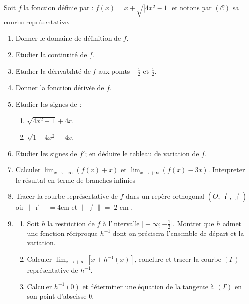 \begin{exo}
\label{exo:fn irrationnelle}
Soit $f$ la fonction d\'efinie par : 
$\displaystyle{
f(x) = x + \sqrt{|4x^2 - 1|}
}$
et notons par $(\mathcal{C})$ sa courbe repr\'esentative.
\begin{enumerate}
\item Donner le domaine de d\'efinition de $f$.
\item Etudier la continuit\'e de $f$.
\item Etudier la d\'erivabilit\'e de $f$ aux points $-\frac{1}{2}$ et $\frac{1}{2}$.
\item Donner la fonction d\'eriv\'ee de $f$.
\item Etudier les signes de : 
     \begin{enumerate}
     \item $\sqrt{4x^2 - 1} + 4x$.
     \item $\sqrt{1 - 4x^2} - 4x$.
     \end{enumerate}
\item Etudier les signes de $f'$; en d\'eduire le tableau de variation de $f$.
\item Calculer $\lim_{x \rightarrow - \infty} \left( f(x) + x \right)$ et $\lim_{x \rightarrow + \infty} \left( f(x) - 3 x \right) $.
      Interpreter le r\'esultat en terme de branches infinies.
\item Tracer la courbe repr\'esentative de $f$ dans un rep\`ere orthogonal $(O, \vec{\imath},\vec{\jmath})$ o\`u $\|\vec{\imath}\| = \text{4cm}$ et $\| \vec{\jmath} \| = \text{ 2 cm } $.
\item 
      \begin{enumerate}
      \item Soit $h$ la restriction de $f$ \`a l'intervalle $]-\infty ; -\frac{1}{2} ]$.
            Montrer que $h$ admet une fonction r\'eciproque $h^{-1}$ dont on pr\'ecisera l'ensemble de d\'epart et la variation.
      \item Calculer $\lim_{x \rightarrow + \infty} \left[ x + h^{-1} (x) \right]$, conclure et tracer la courbe $(\Gamma)$ repr\'esentative de $h^{-1}$.
      \item Calculer $h^{-1} (0)$ et d\'eterminer une \'equation de la tangente \`a $(\Gamma)$ en son point d'abscisse $0$.
      \end{enumerate}
\end{enumerate}
\end{exo}

